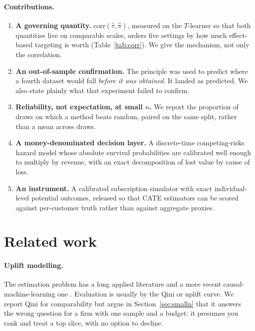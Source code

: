 \documentclass[11pt,a4paper]{article}
\newcommand{\corr}{\mathrm{corr}}
\newcommand{\CATE}{\tau}
\begin{document}
\paragraph{Contributions.}
\begin{enumerate}
  \item \textbf{A governing quantity.} $\corr(\hat\CATE,\hat\pi)$, measured on the
        $T$-learner so that both quantities live on comparable scales, orders five
        settings by how much effect-based targeting is worth
        (Table~\ref{tab:corr}). We give the mechanism, not only the correlation.
  \item \textbf{An out-of-sample confirmation.} The principle was used to predict
        where a fourth dataset would fall \emph{before it was obtained}. It landed
        as predicted. We also state plainly what that experiment failed to confirm.
  \item \textbf{Reliability, not expectation, at small $n$.} We report the
        proportion of draws on which a method beats random, paired on the same
        split, rather than a mean across draws.
  \item \textbf{A money-denominated decision layer.} A discrete-time competing-risks
        hazard model whose absolute survival probabilities are calibrated well
        enough to multiply by revenue, with an exact decomposition of lost value by
        cause of loss.
  \item \textbf{An instrument.} A calibrated subscription simulator with exact
        individual-level potential outcomes, released so that CATE estimators can be
        scored against per-customer truth rather than against aggregate proxies.
\end{enumerate}

\section{Related work}
\label{sec:related}

\paragraph{Uplift modelling.} The estimation problem has a long applied literature
\citep{radcliffe2011,rzepakowski2012} and a more recent causal-machine-learning one
\citep{athey2016,kunzel2019,chernozhukov2018}. Evaluation is usually by the Qini or
uplift curve. We report Qini for comparability but argue in
Section~\ref{sec:smalln} that it answers the wrong question for a firm with one
sample and a budget: it presumes you rank and treat a top slice, with no option to
decline.
\end{document}
